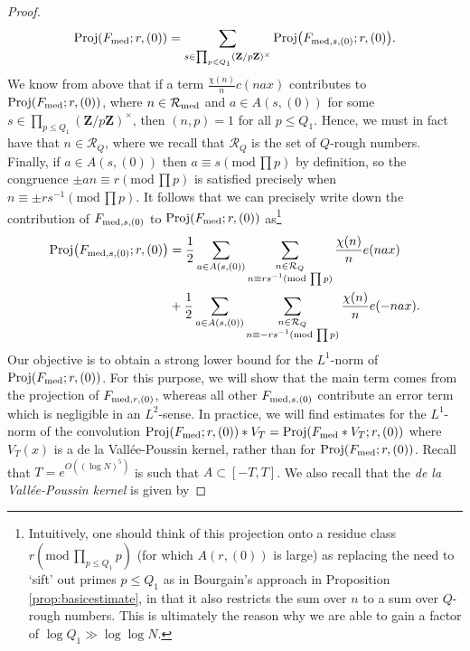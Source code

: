 \documentclass[11pt, reqno]{amsart}
\newcommand{\md}[1]{\ensuremath{(\mbox{mod}\, #1)}}
\newcommand{\mdsub}[1]{\ensuremath{(\mbox{\scriptsize mod}\, #1)}}
\DeclareMathOperator{\Proj}{Proj}
\begin{document}
\begin{proof}
    \begin{align}\label{eq:projdecompomodel}
        \Proj(F_\textnormal{med};r,(0))=\sum_{s\in \prod_{p\leqslant Q_1}(\mathbf{Z}/p\mathbf{Z})^\times}\Proj\bigl(F_{\textnormal{med},s,(0)};r,(0)\bigr).
    \end{align}
    We know from above that if a term $\frac{\chi(n)}{n}c( nax)$ contributes to $\Proj(F_\textnormal{med};r,(0))$, where $n\in\mathcal{R}_\textnormal{med}$ and $a\in A(s,(0))$ for some $s\in \prod_{p\leqslant Q_1}(\mathbf{Z}/p\mathbf{Z})^\times$, then $(n,p)=1$ for all $p\leqslant Q_1$. Hence, we must in fact have that $n\in\mathcal{R}_{Q}$, where we recall that $\mathcal{R}_Q$ is the set of $Q$-rough numbers. Finally, if $a\in A(s,(0))$ then $a\equiv s\md{\prod p}$ by definition, so the congruence $\pm an\equiv r\md{\prod p}$ is satisfied precisely when $n\equiv \pm rs^{-1}\md{\prod p}$. It follows that we can precisely write down the contribution of $F_{\textnormal{med},s,(0)}$ to $\Proj(F_\textnormal{med};r,(0))$ as\footnote{Intuitively, one should think of this projection onto a residue class $r\md{\prod_{p\leqslant Q_1}p}$ (for which $A(r,(0))$ is large) as replacing the need to `sift' out primes $p\leqslant Q_1$ as in Bourgain's approach in Proposition \ref{prop:basicestimate}, in that it also restricts the sum over $n$ to a sum over $Q$-rough numbers. This is ultimately the reason why we are able to gain a factor of $\log Q_1\gg \log  \log N$.}
    \begin{align}\label{eq:projcontmodel} 
    \Proj\bigl(F_{\textnormal{med},s,(0)};r,(0)\bigr)&=\frac{1}{2}\sum_{a\in A(s,(0))}\sum_{\substack{n\in\mathcal{R}_Q\\ n\equiv rs^{-1}\mdsub{\prod p}}}\frac{\chi(n)}{n}e(nax)\\
    &+\frac{1}{2}\sum_{a\in A(s,(0))}\sum_{\substack{n\in\mathcal{R}_Q \\ n\equiv -rs^{-1}\mdsub{\prod p}}}\frac{\chi(n)}{n}e(-nax).\nonumber
    \end{align}
    Our objective is to obtain a strong lower bound for the $L^1$-norm of $\Proj(F_\textnormal{med};r,(0))$. For this purpose, we will show that the main term comes from the projection of $F_{\textnormal{med},r,(0)}$, whereas all other $F_{\textnormal{med},s,(0)}$ contribute an error term which is negligible in an $L^2$-sense. In practice, we will find estimates for the $L^1$-norm of the convolution $\Proj(F_\textnormal{med};r,(0))*V_{T}=\Proj(F_\textnormal{med}*V_{T};r,(0))$ where $V_{T}(x)$ is a de la Vall\'ee-Poussin kernel, rather than for $\Proj(F_\textnormal{med};r,(0))$. Recall that $T=e^{O((\log N)^5)}$ is such that $A\subset [-T,T]$. We also recall that the \emph{de la Vall\'ee-Poussin kernel} is given by

\end{proof}
\end{document}
